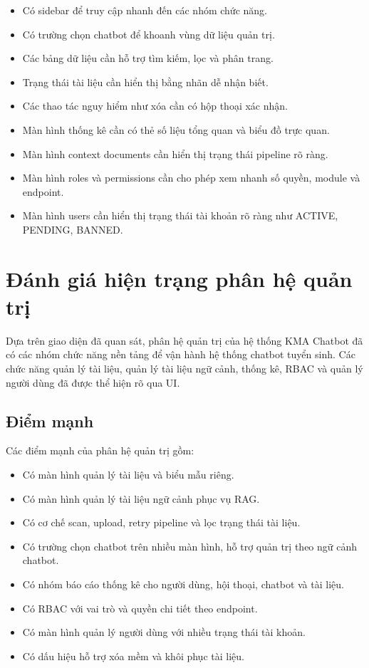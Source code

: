 \documentclass[12pt,a4paper]{report}
\begin{document}
\begin{itemize}
    \item Có sidebar để truy cập nhanh đến các nhóm chức năng.
    \item Có trường chọn chatbot để khoanh vùng dữ liệu quản trị.
    \item Các bảng dữ liệu cần hỗ trợ tìm kiếm, lọc và phân trang.
    \item Trạng thái tài liệu cần hiển thị bằng nhãn dễ nhận biết.
    \item Các thao tác nguy hiểm như xóa cần có hộp thoại xác nhận.
    \item Màn hình thống kê cần có thẻ số liệu tổng quan và biểu đồ trực quan.
    \item Màn hình context documents cần hiển thị trạng thái pipeline rõ ràng.
    \item Màn hình roles và permissions cần cho phép xem nhanh số quyền, module và endpoint.
    \item Màn hình users cần hiển thị trạng thái tài khoản rõ ràng như ACTIVE, PENDING, BANNED.
\end{itemize}

\section{Đánh giá hiện trạng phân hệ quản trị}

Dựa trên giao diện đã quan sát, phân hệ quản trị của hệ thống KMA Chatbot đã có các nhóm chức năng nền tảng để vận hành hệ thống chatbot tuyển sinh. Các chức năng quản lý tài liệu, quản lý tài liệu ngữ cảnh, thống kê, RBAC và quản lý người dùng đã được thể hiện rõ qua UI.

\subsection{Điểm mạnh}

Các điểm mạnh của phân hệ quản trị gồm:

\begin{itemize}
    \item Có màn hình quản lý tài liệu và biểu mẫu riêng.
    \item Có màn hình quản lý tài liệu ngữ cảnh phục vụ RAG.
    \item Có cơ chế scan, upload, retry pipeline và lọc trạng thái tài liệu.
    \item Có trường chọn chatbot trên nhiều màn hình, hỗ trợ quản trị theo ngữ cảnh chatbot.
    \item Có nhóm báo cáo thống kê cho người dùng, hội thoại, chatbot và tài liệu.
    \item Có RBAC với vai trò và quyền chi tiết theo endpoint.
    \item Có màn hình quản lý người dùng với nhiều trạng thái tài khoản.
    \item Có dấu hiệu hỗ trợ xóa mềm và khôi phục tài liệu.
\end{itemize}
\end{document}
